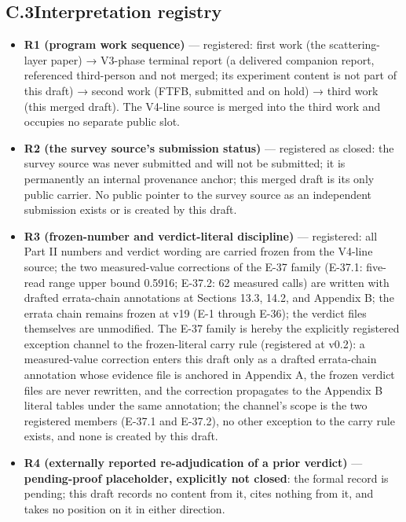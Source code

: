 \documentclass[11pt]{article}
\begin{document}
\subsection*{C.3\quad Interpretation registry}
\begin{itemize}[leftmargin=1.6em,itemsep=2pt,parsep=0pt,topsep=3pt]
\item \textbf{R1 (program work sequence)} — registered: first work (the scattering-layer paper) → V3-phase terminal report (a delivered companion report, referenced third-person and not merged; its experiment content is not part of this draft) → second work (FTFB, submitted and on hold) → third work (this merged draft). The V4-line source is merged into the third work and occupies no separate public slot.
\item \textbf{R2 (the survey source's submission status)} — registered as closed: the survey source was never submitted and will not be submitted; it is permanently an internal provenance anchor; this merged draft is its only public carrier. No public pointer to the survey source as an independent submission exists or is created by this draft.
\item \textbf{R3 (frozen-number and verdict-literal discipline)} — registered: all Part II numbers and verdict wording are carried frozen from the V4-line source; the two measured-value corrections of the E-37 family (E-37.1: five-read range upper bound 0.5916; E-37.2: 62 measured calls) are written with drafted errata-chain annotations at Sections 13.3, 14.2, and Appendix B; the errata chain remains frozen at v19 (E-1 through E-36); the verdict files themselves are unmodified. The E-37 family is hereby the explicitly registered exception channel to the frozen-literal carry rule (registered at v0.2): a measured-value correction enters this draft only as a drafted errata-chain annotation whose evidence file is anchored in Appendix A, the frozen verdict files are never rewritten, and the correction propagates to the Appendix B literal tables under the same annotation; the channel's scope is the two registered members (E-37.1 and E-37.2), no other exception to the carry rule exists, and none is created by this draft.
\item \textbf{R4 (externally reported re-adjudication of a prior verdict)} — \textbf{pending-proof placeholder, explicitly not closed}: the formal record is pending; this draft records no content from it, cites nothing from it, and takes no position on it in either direction.

\end{itemize}
\end{document}
